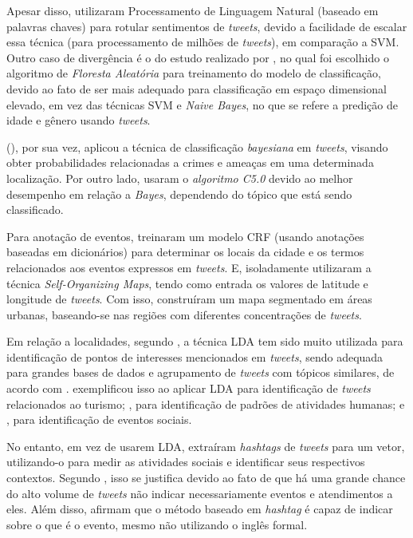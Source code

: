 \documentclass[
	12pt,				%
	oneside,			%
	a4paper,			%
	english,			%
	brazil				%
	]{abntex2ppgsi}
\begin{document}
{{{Apesar disso, \cite{Guo2016} utilizaram Processamento de Linguagem Natural (baseado em palavras chaves) para rotular sentimentos de \textit{tweets}, devido a facilidade de escalar essa técnica (para processamento de milhões de \textit{tweets}), em comparação a SVM. Outro caso de divergência é o do estudo realizado por \cite{Farseev2015}, no qual foi escolhido o algoritmo de \textit{Floresta Aleatória} para treinamento do modelo de classificação, devido ao fato de ser mais adequado para classificação em espaço dimensional elevado, em vez das técnicas SVM e \textit{Naive Bayes}, no que se refere a predição de idade e gênero usando \textit{tweets}.

\citeauthor{Mata2015} (\citeyear{Mata2015}), por sua vez, aplicou a técnica de classificação \textit{bayesiana} em \textit{tweets}, visando obter probabilidades relacionadas a crimes e ameaças em uma determinada localização. Por outro lado, \cite{Zagal2016} usaram o \textit{algoritmo C5.0} devido ao melhor desempenho em relação a \textit{Bayes}, dependendo do tópico que está sendo classificado. 

Para anotação de eventos, \cite{Anantharam2015} treinaram um modelo CRF (usando anotações baseadas em dicionários) para determinar os locais da cidade e os termos relacionados aos eventos expressos em \textit{tweets}. E, isoladamente \cite{Frias-Martinez2014} utilizaram a técnica \textit{Self-Organizing Maps}, tendo como entrada os valores de latitude e longitude de \textit{tweets}. Com isso, construíram um mapa segmentado em áreas urbanas, baseando-se nas regiões com diferentes concentrações de \textit{tweets}.

Em relação a localidades, segundo \cite{Farseev2015}, a técnica LDA tem sido muito utilizada para identificação de pontos de interesses mencionados em \textit{tweets}, sendo adequada para grandes bases de dados e agrupamento de \textit{tweets} com tópicos similares, de acordo com \cite{Steiger2015Census}. \cite{Abbasi2015} exemplificou isso ao aplicar LDA para identificação de \textit{tweets} relacionados ao turismo; \cite{Hasan2014}, para identificação de padrões de atividades humanas; e \cite{DiLorenzo2013}, para identificação de eventos sociais.

No entanto, \cite{Ni2016} em vez de usarem LDA, extraíram \textit{hashtags} de \textit{tweets} para um vetor, utilizando-o para medir as atividades sociais e identificar seus respectivos contextos. Segundo \cite{Ni2016}, isso se justifica devido ao fato de que há uma grande chance do alto volume de \textit{tweets} não indicar necessariamente eventos e atendimentos a eles. Além disso, afirmam que o método baseado em \textit{hashtag} é capaz de indicar sobre o que é o evento, mesmo não utilizando o inglês formal.

}}}
\end{document}
